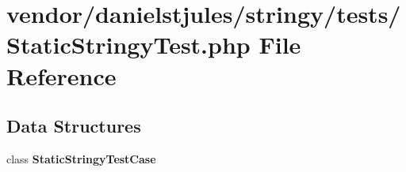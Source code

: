 \section{vendor/danielstjules/stringy/tests/\+Static\+Stringy\+Test.php File Reference}
\label{_static_stringy_test_8php}
\subsection*{Data Structures}
\begin{DoxyCompactItemize}
\item 
class {\bf Static\+Stringy\+Test\+Case}
\end{DoxyCompactItemize}
